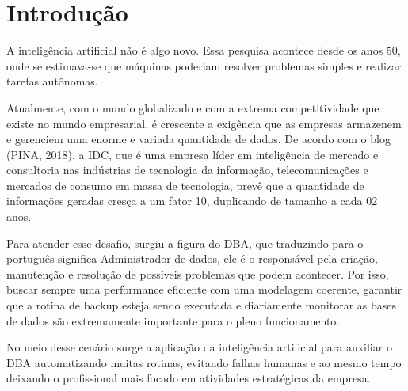 \chapter{Introdução}

A inteligência artificial não é algo novo. Essa pesquisa acontece desde os anos 50, onde se estimava-se que máquinas poderiam resolver problemas simples e realizar tarefas autônomas.


Atualmente, com o mundo globalizado e com a extrema competitividade que existe no mundo empresarial, é crescente a exigência que as empresas armazenem e gerenciem uma enorme e variada quantidade de dados. De acordo com o blog (PINA, 2018), a IDC, que é uma empresa líder em inteligência de mercado e consultoria nas indústrias de tecnologia da informação, telecomunicações e mercados de consumo em massa de tecnologia, prevê que a quantidade de informações geradas cresça a um fator 10, duplicando de tamanho a cada 02 anos.


Para atender esse desafio, surgiu a figura do DBA, que traduzindo para o português significa Administrador de dados, ele é o responsável pela criação, manutenção e resolução de possíveis problemas que podem acontecer. Por isso, buscar sempre uma performance eficiente com uma modelagem coerente, garantir que a rotina de backup esteja sendo executada e diariamente monitorar as bases de dados são extremamente importante para o pleno funcionamento.

No meio desse cenário surge a aplicação da inteligência artificial para auxiliar o DBA automatizando muitas rotinas, evitando falhas humanas e ao mesmo tempo deixando o profissional mais focado em atividades estratégicas da empresa.